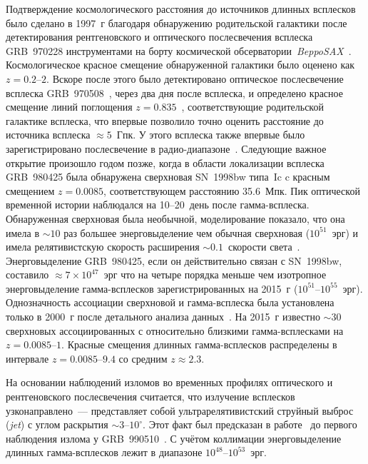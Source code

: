 Подтверждение космологического расстояния до источников длинных всплесков 
было сделано в 1997~г благодаря обнаружению родительской галактики после детектирования 
рентгеновского и оптического послесвечения всплеска GRB~970228 инструментами на 
борту космической обсерватории~\textit{BeppoSAX}~\citep{Costa1997Natur, van_Paradijs_1997Natur}.
Космологическое красное смещение обнаруженной галактики было оценено как $z=0.2\textrm{--}2$.
Вскоре после этого было детектировано оптическое послесвечение всплеска 
GRB~970508~\citep{Djorgovski_1997Natur}, через два дня после всплеска, и определено красное смещение линий 
поглощения $z=0.835$~\citep{Metzger_1997Natur, Reichart_1998ApJ}, соответствующие родительской галактике 
всплеска, что впервые позволило точно оценить расстояние до источника всплеска $\approx 5$~Гпк. 
У этого всплеска также впервые было зарегистрировано послесвечение в радио-диапазоне~\citep{Frail_1997Natur}.
Следующие важное открытие произошло годом позже, когда в области локализации 
всплеска GRB~980425 была обнаружена сверхновая SN~1998bw типа~Ic c красным смещением $z=0.0085$,
соответствующем расстоянию 35.6~Мпк.
Пик оптической временной истории наблюдался на 10--20~день после гамма-всплеска.
Обнаруженная сверхновая была необычной, моделирование показало, что она 
имела в $\sim 10$ раз большее энерговыделение чем обычная 
сверхновая ($10^{51}$~эрг) и имела релятивистскую скорость расширения 
$\sim 0.1$~скорости света~\citep{Hjorth_and_Bloom_2012in_book}. 
Энерговыделение GRB~980425, если он действительно связан с SN~1998bw, составило 
$\approx 7\times 10^{47}$~эрг что на четыре порядка меньше чем изотропное энерговыделение 
гамма-всплесков зарегистрированных на 2015~г ($10^{51}$--$10^{55}$~эрг).
Однозначность ассоциации сверхновой и гамма-всплеска была установлена только в 2000~г
после детального анализа данных~\citep{Pian_2000ApJ}. На 2015~г известно $\sim 30$
сверхновых ассоциированных с относительно близкими гамма-всплесками на $z=0.0085\mbox{--}1$.
Красные смещения длинных гамма-всплесков распределены в интервале $z=0.0085\mbox{--}9.4$ 
со средним $z\approx 2.3$.

На основании наблюдений изломов во временных профилях оптического и рентгеновского послесвечения 
считается, что излучение всплесков узконаправлено~--- представляет собой  ультрарелятивистский 
струйный выброс (\textit{jet}) с углом раскрытия $\sim 3$--$10^{\circ}$. 
Этот факт был предсказан в работе~\citep{Rhoads_1999ApJ} до первого наблюдения излома у GRB~990510~\citep{Stanek_1999ApJ}. 
С учётом коллимации энерговыделение длинных гамма-всплесков лежит в диапазоне $10^{48}$--$10^{53}$~эрг.

